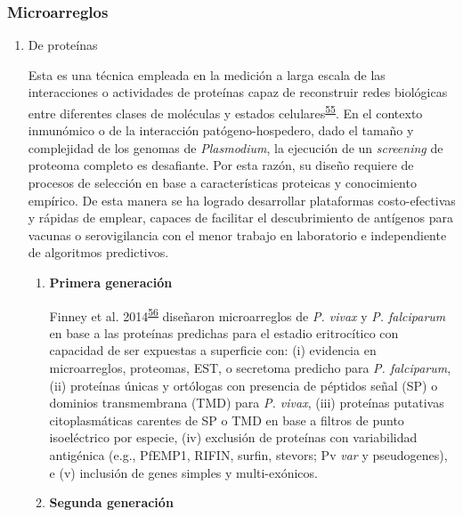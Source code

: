 \documentclass[]{article}
\begin{document}
\subsubsection{Microarreglos}\label{microarreglos}

\begin{enumerate}
\def\labelenumi{\alph{enumi}.}
\item
  De proteínas

  Esta es una técnica empleada en la medición a larga escala de las
  interacciones o actividades de proteínas capaz de reconstruir redes
  biológicas entre diferentes clases de moléculas y estados
  celulares\textsuperscript{\protect\hyperlink{ref-uzoma2013interactome}{55}}.
  En el contexto inmunómico o de la interacción patógeno-hospedero, dado
  el tamaño y complejidad de los genomas de \emph{Plasmodium}, la
  ejecución de un \emph{screening} de proteoma completo es desafiante.
  Por esta razón, su diseño requiere de procesos de selección en base a
  características proteicas y conocimiento empírico. De esta manera se
  ha logrado desarrollar plataformas costo-efectivas y rápidas de
  emplear, capaces de facilitar el descubrimiento de antígenos para
  vacunas o serovigilancia con el menor trabajo en laboratorio e
  independiente de algoritmos predictivos.

  \begin{enumerate}
  \def\labelenumii{\roman{enumii}.}
  \item
    \textbf{Primera generación}

    Finney et al.
    2014\textsuperscript{\protect\hyperlink{ref-Finney2014}{56}}
    diseñaron microarreglos de \emph{P. vivax} y \emph{P. falciparum} en
    base a las proteínas predichas para el estadio eritrocítico con
    capacidad de ser expuestas a superficie con: (i) evidencia en
    microarreglos, proteomas, EST, o secretoma predicho para \emph{P.
    falciparum}, (ii) proteínas únicas y ortólogas con presencia de
    péptidos señal (SP) o dominios transmembrana (TMD) para \emph{P.
    vivax}, (iii) proteínas putativas citoplasmáticas carentes de SP o
    TMD en base a filtros de punto isoeléctrico por especie, (iv)
    exclusión de proteínas con variabilidad antigénica (e.g., PfEMP1,
    RIFIN, surfin, stevors; Pv \emph{var} y pseudogenes), e (v)
    inclusión de genes simples y multi-exónicos.
  \item
    \textbf{Segunda generación}


\end{enumerate}
\end{enumerate}
\end{document}
